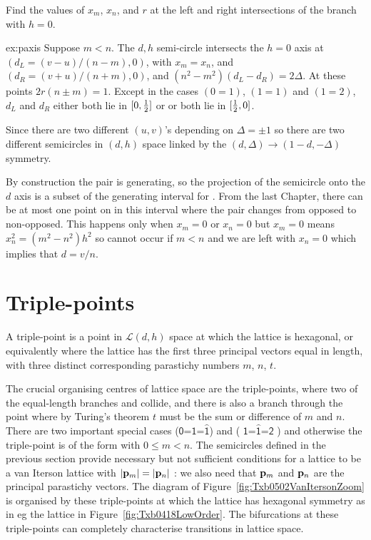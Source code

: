 \begin{jExercise}\label{ex:paxis}
	Find the values of $x_m$, $x_n$, and $r$ at the left and right
	intersections of the  branch with $h=0$.
\end{jExercise}
\begin{jAnswer}{ex:paxis}
	Suppose $m<n$. The $d,h$ semi-circle intersects the $h=0$ axis 
	at $(d_L= (v-u)/(n-m),0)$, with $x_m=x_n$, and $(d_R=(v+u)/(n+m),0)$, 
	and $(n^2-m^2)(d_L-d_R) = 2\Delta$. 
	At these points $2r(n\pm m)=1$.
Except in the cases $(0=1)$, $(1=1)$ and $(1=2)$,  $d_L$ and $d_R$ either both lie in $[0,\textstyle{\frac{1}{2}}]$ or or both lie in $[\textstyle{\frac{1}{2}},0]$.
\end{jAnswer}



Since there are two different $(u,v)$'s depending on $\Delta=\pm 1$ so there are two different semicircles in $(d,h)$ space linked by the $(d,\Delta)\rightarrow(1-d,-\Delta)$ symmetry.

By construction the pair is generating, so the projection of the semicircle onto the $d$ axis is a subset of the generating interval for . From the last Chapter, there can be at most one point on in this interval where the pair changes from opposed to non-opposed. This happens only when $x_m=0$ or $x_n=0$ but
$x_m=0$ means $x_n^2=(m^2-n^2)h^2$ so cannot occur if $m<n$  and we are left with $x_n=0$ which implies that $d=v/n$. 


\section{Triple-points}
\label{sec:triplep}
\begin{definition}
	A {triple-point}  is a point in $\mathcal{L}(d,h)$ space at which the lattice is hexagonal, or equivalently where the lattice has the first three  principal vectors equal in length, with three distinct corresponding parastichy numbers $m$, $n$, $t$. 
\end{definition}
The crucial organising centres of lattice space are the triple-points, where two of the equal-length branches  and  collide, and there is also a branch  through the point where by Turing's theorem $t$ must be the sum or difference of $m$ and $n$. There are two important special cases
\textsf{	 (\ensuremath{\textsf{0=1=}\hat{\textsf{1}}})}
  and 
\textsf{   (
\ensuremath{ 
	\textsf{1=}
	\hat{\textsf{1}}
	\textsf{=2}}
)}
and otherwise the  triple-point is of the form  with $0\leq m<n$. 
The semicircles defined in the previous section provide necessary but not sufficient conditions for a lattice to be a van Iterson lattice with $|{\mathbf p}_{m}|=|{\mathbf p}_{n}|$ : we also need that ${\mathbf p}_{m}$ and ${\mathbf p}_{n}$ are the principal parastichy vectors. 
The diagram of  Figure~\ref{fig:Txb0502VanItersonZoom} is organised by these triple-points  at which the lattice has hexagonal symmetry as in eg the  lattice in Figure~\ref{fig:Txb0418LowOrder}. The bifurcations at these triple-points can completely characterise transitions in lattice space.


